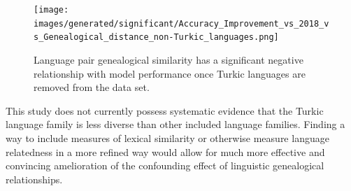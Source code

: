\begin{figure}[ht]
\texttt{[image: images/generated/significant/Accuracy\_Improvement\_vs\_2018\_vs\_Genealogical\_distance\_non-Turkic\_languages.png]}
\centering
\caption{Language pair genealogical similarity has a significant negative relationship with model performance once Turkic languages are removed from the data set.}
\end{figure}

This study does not currently possess systematic evidence that the Turkic language family is less diverse than other included language families. Finding a way to include measures of lexical similarity or otherwise measure language relatedness in a more refined way would allow for much more effective and convincing amelioration of the confounding effect of linguistic genealogical relationships.